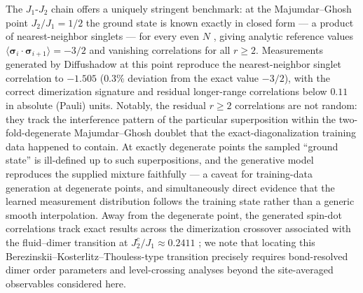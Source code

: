 

The $J_1$-$J_2$ chain offers a uniquely stringent benchmark: at the
Majumdar--Ghosh point $J_2/J_1 = 1/2$ the ground state is known exactly in
closed form --- a product of nearest-neighbor singlets --- for every even
$N$ \cite{majumdar1969next}, giving analytic reference values
$\langle\boldsymbol{\sigma}_i\cdot\boldsymbol{\sigma}_{i+1}\rangle = -3/2$
and vanishing correlations for all $r\ge 2$. Measurements generated by
Diffushadow at this point reproduce the nearest-neighbor singlet
correlation to $-1.505$ ($0.3\%$ deviation from the exact value $-3/2$),
with the correct dimerization signature and residual longer-range
correlations below $0.11$ in absolute (Pauli) units. Notably, the residual
$r\ge2$ correlations are not random: they track the interference pattern
of the particular superposition within the two-fold-degenerate
Majumdar--Ghosh doublet that the exact-diagonalization training data
happened to contain. At exactly degenerate points the sampled ``ground
state'' is ill-defined up to such superpositions, and the generative model
reproduces the supplied mixture faithfully --- a caveat for training-data
generation at degenerate points, and simultaneously direct evidence that
the learned measurement distribution follows the training state rather
than a generic smooth interpolation. Away from the degenerate point, the
generated spin-dot correlations track exact results across the
dimerization crossover associated with the fluid--dimer transition at
$J_2^{c}/J_1 \approx 0.2411$ \cite{okamoto1992fluid}; we note that
locating this Berezinskii--Kosterlitz--Thouless-type transition precisely
requires bond-resolved dimer order parameters and level-crossing analyses
beyond the site-averaged observables considered here.


